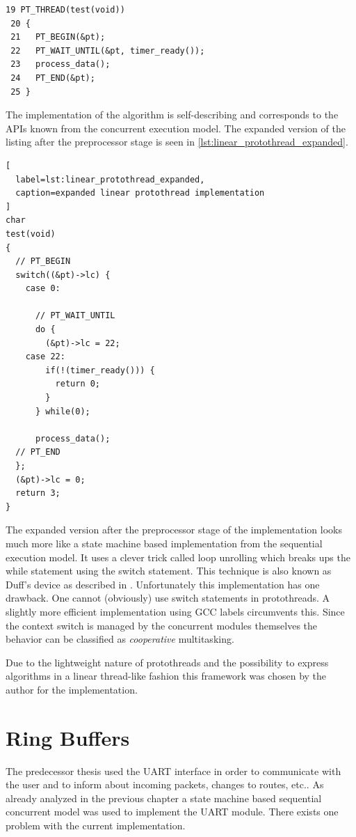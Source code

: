 \begin{lstlisting}[label=lst:linear_protothread,caption=linear protothread implementation]
 19 PT_THREAD(test(void))
 20 {
 21   PT_BEGIN(&pt);
 22   PT_WAIT_UNTIL(&pt, timer_ready());
 23   process_data();
 24   PT_END(&pt);
 25 }
\end{lstlisting}

The implementation of the algorithm is self-describing and corresponds to the APIs known from the concurrent execution model. The expanded version of the listing after the preprocessor stage is seen in \ref{lst:linear_protothread_expanded}.

\begin{lstlisting}[
  label=lst:linear_protothread_expanded,
  caption=expanded linear protothread implementation
]
char
test(void)
{
  // PT_BEGIN
  switch((&pt)->lc) {
    case 0:

      // PT_WAIT_UNTIL
      do {
        (&pt)->lc = 22;
    case 22:
        if(!(timer_ready())) {
          return 0;
        }
      } while(0);

      process_data();
  // PT_END
  };
  (&pt)->lc = 0;
  return 3;
}
\end{lstlisting}

The expanded version after the preprocessor stage of the implementation looks much more like a state machine based implementation from the sequential execution model. It uses a clever trick called loop unrolling \cite{abrash} which breaks ups the while statement using the switch statement. This technique is also known as Duff's device as described in \cite{duff}. Unfortunately this implementation has one drawback. One cannot (obviously) use switch statements in protothreads. A slightly more efficient implementation using GCC labels circumvents this. Since the context switch is managed by the concurrent modules themselves the behavior can be classified as \emph{cooperative} multitasking.

Due to the lightweight nature of protothreads and the possibility to express algorithms in a linear thread-like fashion this framework was chosen by the author for the implementation.

\section{Ring Buffers}%
The predecessor thesis \cite{korniowski} used the UART interface in order to communicate with the user and to inform about incoming packets, changes to routes, etc.. As already analyzed in the previous chapter a state machine based sequential concurrent model was used to implement the UART module. There exists one problem with the current implementation.

